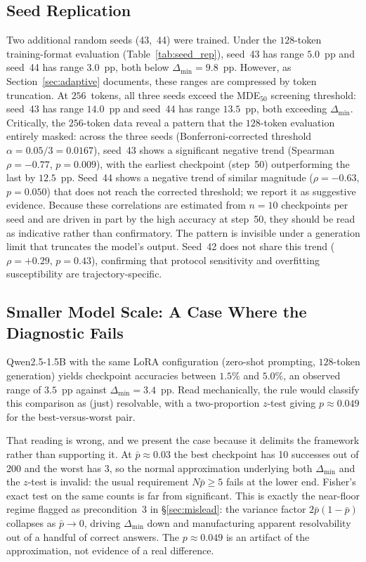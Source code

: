 \documentclass[pdflatex,sn-mathphys-ay,iicol]{sn-jnl}
\theoremstyle{thmstylethree}
\begin{document}
\begin{table}[t]
\subsection{Seed Replication}\label{sec:seeds}

Two additional random seeds (43,~44) were trained. Under the $128$-token training-format evaluation (Table~\ref{tab:seed_rep}), seed~43 has range $5.0$~pp and seed~44 has range $3.0$~pp, both below $\Delta_{\min}=9.8$~pp. However, as Section~\ref{sec:adaptive} documents, these ranges are compressed by token truncation. At $256$~tokens, all three seeds exceed the MDE$_{50}$ screening threshold: seed~43 has range $14.0$~pp and seed~44 has range $13.5$~pp, both exceeding $\Delta_{\min}$. Critically, the $256$-token data reveal a pattern that the $128$-token evaluation entirely masked: across the three seeds (Bonferroni-corrected threshold $\alpha=0.05/3=0.0167$), seed~43 shows a significant negative trend (Spearman $\rho=-0.77$, $p=0.009$), with the earliest checkpoint (step~50) outperforming the last by $12.5$~pp. Seed~44 shows a negative trend of similar magnitude ($\rho=-0.63$, $p=0.050$) that does not reach the corrected threshold; we report it as suggestive evidence. Because these correlations are estimated from $n=10$ checkpoints per seed and are driven in part by the high accuracy at step~50, they should be read as indicative rather than confirmatory. The pattern is invisible under a generation limit that truncates the model's output. Seed~42 does not share this trend ($\rho=+0.29$, $p=0.43$), confirming that protocol sensitivity and overfitting susceptibility are trajectory-specific.

\subsection{Smaller Model Scale: A Case Where the Diagnostic Fails}\label{sec:small_scale}

Qwen2.5-1.5B with the same LoRA configuration (zero-shot prompting, $128$-token generation) yields checkpoint accuracies between $1.5\%$ and $5.0\%$, an observed range of $3.5$~pp against $\Delta_{\min}=3.4$~pp. Read mechanically, the rule would classify this comparison as (just) resolvable, with a two-proportion $z$-test giving $p\approx0.049$ for the best-versus-worst pair.

That reading is wrong, and we present the case because it delimits the framework rather than supporting it. At $\bar p \approx 0.03$ the best checkpoint has 10 successes out of 200 and the worst has 3, so the normal approximation underlying both $\Delta_{\min}$ and the $z$-test is invalid: the usual requirement $N\bar p \geq 5$ fails at the lower end. Fisher's exact test on the same counts is far from significant. This is exactly the near-floor regime flagged as precondition~3 in \S\ref{sec:mislead}: the variance factor $2\bar p(1-\bar p)$ collapses as $\bar p \to 0$, driving $\Delta_{\min}$ down and manufacturing apparent resolvability out of a handful of correct answers. The $p\approx0.049$ is an artifact of the approximation, not evidence of a real difference.


\end{table}
\end{document}
